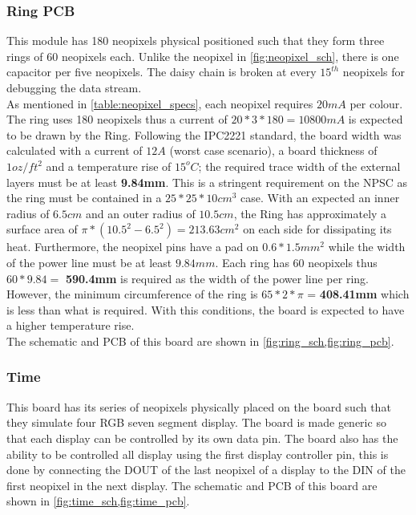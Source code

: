 \subsubsection{Ring PCB}\label{ring_pcb}
This module has 180 neopixels physical positioned such that they form three rings of 60 neopixels each. Unlike the neopixel in \cref{fig:neopixel_sch}, there is one capacitor per five neopixels. The daisy chain is broken at every $15^{th}$ neopixels for debugging the data stream. \\
As mentioned in \cref{table:neopixel_specs}, each neopixel requires $20mA$ per colour. The ring uses 180 neopixels thus a current of $20*3*180 = 10800 mA$ is expected to be drawn by the Ring. Following the IPC2221 standard, the board width was calculated with a current of $12A$ (worst case scenario), a board thickness of $1oz/ft^2$ and a temperature rise of $15^oC$; the required trace width of the external layers must be at least \textbf{9.84mm}. This is a stringent requirement on the NPSC as the ring must be contained in a $25*25*10cm^3$ case. With an expected an inner radius of $6.5cm$ and an outer radius of $10.5cm$, the Ring has approximately a surface area of $ \pi*(10.5^2-6.5^2) = 213.63 cm^2$ on each side for dissipating its heat. Furthermore, the neopixel pins have a pad on $0.6*1.5 mm^2$ while the width of the power line must be at least $9.84mm$. Each ring has 60 neopixels thus $60*9.84=$ \textbf{590.4mm} is required as the width of the power line per ring. However, the minimum circumference of the ring is $65*2*\pi$ = \textbf{408.41mm} which is less than what is required. With this conditions, the board is expected to have a higher temperature rise.\\
The schematic and PCB of this board are shown in \cref{fig:ring_sch,fig:ring_pcb}.

\subsubsection{Time}
This board has its series of neopixels physically placed on the board such that they simulate four RGB seven segment display. The board is made generic so that each display can be controlled by its own data pin. The board also has the ability to be controlled all display using the first display controller pin, this is done by connecting the DOUT of the last neopixel of a display to the DIN of the first neopixel in the next display.
The schematic and PCB of this board are shown in \cref{fig:time_sch,fig:time_pcb}.

